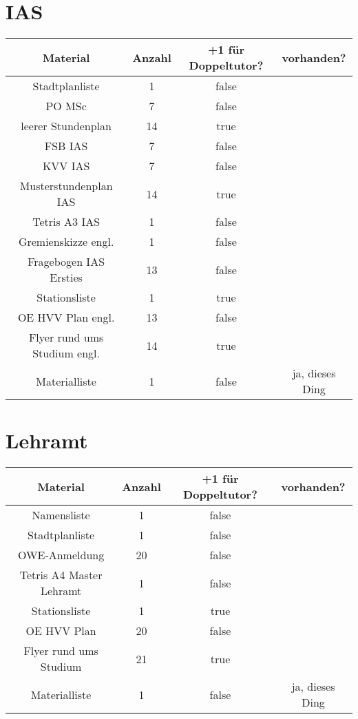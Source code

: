 \documentclass[10pt,a4paper,oneside,ngerman,numbers=noenddot]{scrartcl}
\begin{document}
\section{IAS}

	\begin{tabular}{c|c|c|c}
		\textbf{Material} & \textbf{Anzahl} & \textbf{+1 für Doppeltutor?} & \textbf{vorhanden?} \\
		\hline
		Stadtplanliste & 1 & false & \\
		\hline
		PO MSc & 7 & false & \\
		\hline
		leerer Stundenplan & 14 & true & \\
		\hline
		FSB IAS & 7 & false & \\
		\hline
		KVV IAS & 7 & false & \\
		\hline
		Musterstundenplan IAS & 14 & true & \\
		\hline
		Tetris A3 IAS & 1 & false & \\
		\hline
		Gremienskizze engl. & 1 & false & \\
		\hline
		Fragebogen IAS Ersties & 13 & false & \\
		\hline
		Stationsliste & 1 & true & \\
		\hline
		OE HVV Plan engl. & 13 & false & \\
		\hline
		Flyer rund ums Studium engl. & 14 & true & \\
		\hline
		Materialliste & 1 & false & ja, dieses Ding \\
	\end{tabular}

\section{Lehramt}

	\begin{tabular}{c|c|c|c}
		\textbf{Material} & \textbf{Anzahl} & \textbf{+1 für Doppeltutor?} & \textbf{vorhanden?} \\
		\hline
		Namensliste & 1 & false & \\
		\hline
		Stadtplanliste & 1 & false & \\
		\hline
		OWE-Anmeldung & 20 & false & \\
		\hline
		Tetris A4 Master Lehramt & 1 & false & \\
		\hline
		Stationsliste & 1 & true & \\
		\hline
		OE HVV Plan & 20 & false & \\
		\hline
		Flyer rund ums Studium & 21 & true & \\
		\hline
		Materialliste & 1 & false & ja, dieses Ding \\
	\end{tabular}
\end{document}
